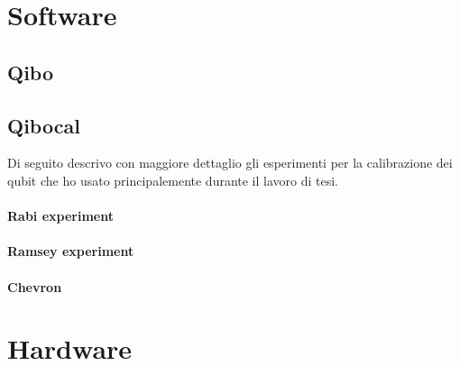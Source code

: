\section{Software}

\subsection{Qibo}

\subsection{Qibocal}

Di seguito descrivo con maggiore dettaglio gli esperimenti per la calibrazione dei qubit che ho usato principalemente durante il lavoro di tesi.
\paragraph{Rabi experiment}

\paragraph{Ramsey experiment}

\paragraph{Chevron}


\section{Hardware}

